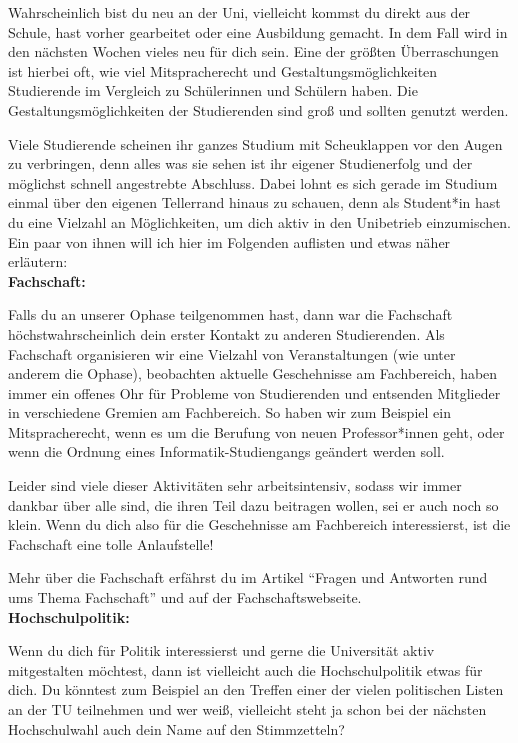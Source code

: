 {Wahrscheinlich bist du neu an der Uni, vielleicht kommst du direkt aus der Schule, hast vorher gearbeitet oder eine Ausbildung gemacht. In dem Fall wird in den nächsten Wochen vieles neu für dich sein. Eine der größten Überraschungen ist hierbei oft, wie viel Mitspracherecht und Gestaltungsmöglichkeiten Studierende im Vergleich zu Schülerinnen und Schülern haben. Die Gestaltungsmöglichkeiten der Studierenden sind groß und sollten genutzt werden.
}{
    Viele Studierende scheinen ihr ganzes Studium mit Scheuklappen vor den Augen zu verbringen, denn alles was sie sehen ist ihr eigener Studienerfolg und der möglichst schnell angestrebte Abschluss. Dabei lohnt es sich gerade im Studium einmal über den eigenen Tellerrand hinaus zu schauen, denn als Student*in hast du eine Vielzahl an Möglichkeiten, um dich aktiv in den Unibetrieb einzumischen. Ein paar von ihnen will ich hier im Folgenden auflisten und etwas näher erläutern:\\

    \textbf{Fachschaft:}

    Falls du an unserer Ophase teilgenommen hast, dann war die Fachschaft höchstwahrscheinlich dein erster Kontakt zu anderen Studierenden. Als Fachschaft organisieren wir eine Vielzahl von Veranstaltungen (wie unter anderem die Ophase),  beobachten aktuelle Geschehnisse am Fachbereich, haben immer ein offenes Ohr für Probleme von Studierenden und entsenden Mitglieder in verschiedene Gremien am Fachbereich. So haben wir zum Beispiel ein Mitspracherecht, wenn es um die Berufung von neuen Professor*innen geht, oder wenn die Ordnung eines Informatik-Studiengangs geändert werden soll.

    Leider sind viele dieser Aktivitäten sehr arbeitsintensiv, sodass wir immer dankbar über alle sind, die ihren Teil dazu beitragen wollen, sei er auch noch so klein. Wenn du dich also für die Geschehnisse am Fachbereich interessierst, ist die Fachschaft eine tolle Anlaufstelle!

    Mehr über die Fachschaft erfährst du im Artikel "`Fragen und Antworten rund ums Thema Fachschaft"' und auf der Fachschaftswebseite\footnotemark[1].\\

    \textbf{Hochschulpolitik:}

    Wenn du dich für Politik interessierst und gerne die Universität aktiv mitgestalten möchtest, dann ist vielleicht auch die Hochschulpolitik etwas für dich. Du könntest zum Beispiel an den Treffen einer der vielen politischen Listen an der TU teilnehmen und wer weiß, vielleicht steht ja schon bei der nächsten Hochschulwahl auch dein Name auf den Stimmzetteln?

}
